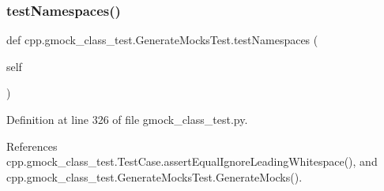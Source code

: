 \subsubsection{\texorpdfstring{test\+Namespaces()}{testNamespaces()}}
{\footnotesize\ttfamily def cpp.\+gmock\+\_\+class\+\_\+test.\+Generate\+Mocks\+Test.\+test\+Namespaces (\begin{DoxyParamCaption}\item[{}]{self }\end{DoxyParamCaption})}



Definition at line 326 of file gmock\+\_\+class\+\_\+test.\+py.



References cpp.\+gmock\+\_\+class\+\_\+test.\+Test\+Case.\+assert\+Equal\+Ignore\+Leading\+Whitespace(), and cpp.\+gmock\+\_\+class\+\_\+test.\+Generate\+Mocks\+Test.\+Generate\+Mocks().


